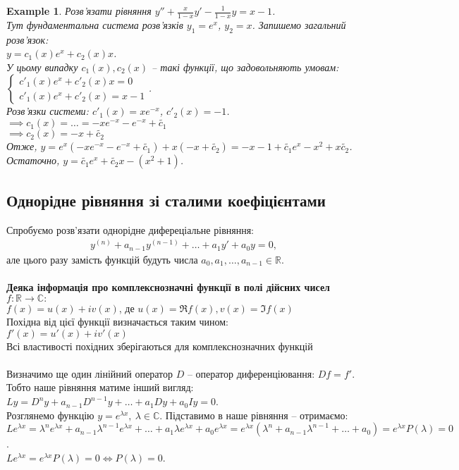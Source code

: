 \documentclass[a4paper, 10pt]{article}
\theoremstyle{theoremdd}
\theoremstyle{theoremdd}
\theoremstyle{theoremdd}
\theoremstyle{theoremdd}
\newtheorem{example}[theorem]{Example}
\theoremstyle{theoremdd}
\theoremstyle{theoremdd}
\theoremstyle{theoremdd}
\theoremstyle{theoremdd}
\begin{document}
\begin{example}
Розв'язати рівняння $\displaystyle y'' + \frac{x}{1-x}y' - \frac{1}{1-x}y = x-1$.\\
Тут фундаментальна система розв'язків $y_1 = e^x$, $y_2 = x$. Запишемо загальний розв'язок:\\
$y = c_1(x)e^x +c_2(x)x$.\\
У цьому випадку $c_1(x), c_2(x)$ -- такі функції, що задовольняють умовам:\\
$\begin{cases}
c'_1(x)e^x + c'_2(x)x = 0\\
c'_1(x)e^x + c'_2(x) = x-1
\end{cases}$.\\
Розв'язки системи: $c'_1(x) = xe^{-x}$, $c'_2(x) = -1$.\\
$\implies c_1(x) = \dots = -xe^{-x} -e^{-x} + \tilde{c_1}$\\
$\implies c_2(x) = -x + \tilde{c_2}$\\
Отже, $y = e^x(-xe^{-x}-e^{-x}+\tilde{c_1}) + x(-x+\tilde{c_2}) = -x - 1 + \tilde{c_1}e^x - x^2 + x \tilde{c_2}$.\\
Остаточно, $y = \tilde{c_1}e^{x} + \tilde{c_2}x - (x^2 + 1)$.
\end{example}

\subsection{Однорідне рівняння зі сталими коефіцієнтами}
Спробуємо розв'язати однорідне дифереціальне рівняння:
\begin{align*}
y^{(n)} + a_{n-1}y^{(n-1)}+\dots+a_1y'+a_0y = 0,
\end{align*}
але цього разу замість функцій будуть числа $a_0, a_1,\dots,a_{n-1} \in \mathbb{R}$.\\
\\ 
\textbf{Деяка інформація про комплекснозначні функції в полі дійсних чисел}\\
$f\colon \mathbb{R} \to \mathbb{C}:$\\
$f(x) = u(x) + iv(x)$, де $u(x) = \Re f(x), v(x) = \Im f(x)$\\
Похідна від цієї функції визначається таким чином:\\
$f'(x) = u'(x) + iv'(x)$\\
Всі властивості похідних зберігаються для комплекснозначних функцій
\\
\\
Визначимо ще один лінійний оператор $D$ -- оператор диференціювання: $Df = f'$. Тобто наше рівняння матиме інший вигляд:\\
$Ly = D^n y + a_{n-1}D^{n-1} y + \dots + a_1Dy + a_0Iy = 0$.\\
Розглянемо функцію $\displaystyle y = e^{\lambda x},\ \lambda \in \mathbb{C}$. Підставимо в наше рівняння -- отримаємо:\\
$Le^{\lambda x} = \lambda^n e^{\lambda x} + a_{n-1} \lambda^{n-1} e^{\lambda x} + \dots + a_1 \lambda e^{\lambda x} + a_0 e^{\lambda x} = e^{\lambda x} \left( \lambda^n + a_{n-1} \lambda^{n-1} + \dots + a_0 \right) = e^{\lambda x} P(\lambda) = 0$.\\
$Le^{\lambda x} = e^{\lambda x} P(\lambda) = 0 \iff P(\lambda) = 0$.
\end{document}
